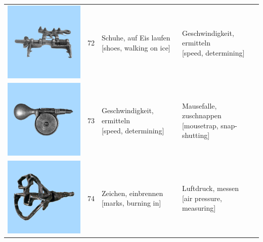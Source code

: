 \documentclass[
  english,
  doc,12pt,twoside,floatsintext]{apa7}
\begin{document}
\begin{center}
\begin{ThreePartTable}
{\begin{longtable}{llll}
\includegraphics[valign=c, scale=0.23]{../materials/unfamiliar/72.png} & 72 & \makecell[l]{Schuhe, auf Eis laufen\\{[shoes, walking on ice]}} & \makecell[l]{Geschwindigkeit, ermitteln\\{[speed, determining]}}\\
\includegraphics[valign=c, scale=0.23]{../materials/unfamiliar/73.png} & 73 & \makecell[l]{Geschwindigkeit, ermitteln\\{[speed, determining]}} & \makecell[l]{Mausefalle, zuschnappen\\{[mousetrap, snap-shutting]}}\\
\includegraphics[valign=c, scale=0.23]{../materials/unfamiliar/74.png} & 74 & \makecell[l]{Zeichen, einbrennen\\{[marks, burning in]}} & \makecell[l]{Luftdruck, messen\\{[air pressure, measuring]}}\\

\end{longtable}}
\end{ThreePartTable}
\end{center}
\end{document}
